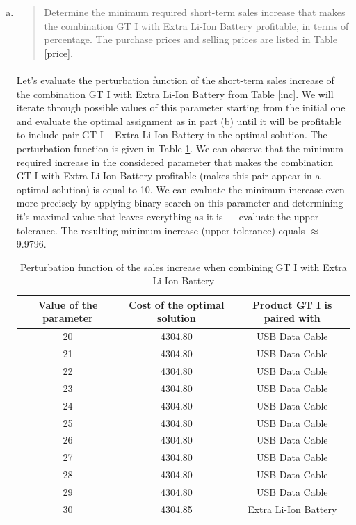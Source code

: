 \begin{enumerate}[(a)]
\setcounter{enumi}{0}
\item\begin{quote}Determine the minimum required short-term sales increase that makes the combination
GT I with Extra Li-Ion Battery profitable, in terms of percentage. The
purchase prices and selling prices are listed in Table \ref{price}.\end{quote}

	\paragraph{}
	Let's evaluate the perturbation function of the short-term sales increase of the combination GT I with Extra Li-Ion Battery from Table \ref{inc}. We will iterate through possible values of this parameter starting from the initial one and evaluate the optimal assignment as in part (b) until it will be profitable to include pair GT I -- Extra Li-Ion Battery in the optimal solution. The perturbation function is given in Table \ref{tol-5-a}. We can observe that the minimum required increase in the considered parameter that makes the combination GT I with Extra Li-Ion Battery profitable (makes this pair appear in a optimal solution) is equal to 10. We can evaluate the minimum increase even more precisely by applying binary search on this parameter and determining it's maximal value that leaves everything as it is --- evaluate the upper tolerance. The resulting minimum increase (upper tolerance) equals $\approx$9.9796.

\begin{table}[H]
	\centering
	\caption{Perturbation function of the sales increase when combining GT I with Extra Li-Ion Battery}
	\begin{tabular}{|c|c|c|}\hline
	Value of the parameter & Cost of the optimal solution & Product GT I is paired with \\ \hline
20 & 4304.80 & USB Data Cable \\
21 & 4304.80 & USB Data Cable \\
22 & 4304.80 & USB Data Cable \\
23 & 4304.80 & USB Data Cable \\
24 & 4304.80 & USB Data Cable \\
25 & 4304.80 & USB Data Cable \\
26 & 4304.80 & USB Data Cable \\
27 & 4304.80 & USB Data Cable \\
28 & 4304.80 & USB Data Cable \\
29 & 4304.80 & USB Data Cable \\
30 & 4304.85 & Extra Li-Ion Battery \\
	\hline
	\end{tabular}
	\label{tol-5-a}
\end{table}


\end{enumerate}
